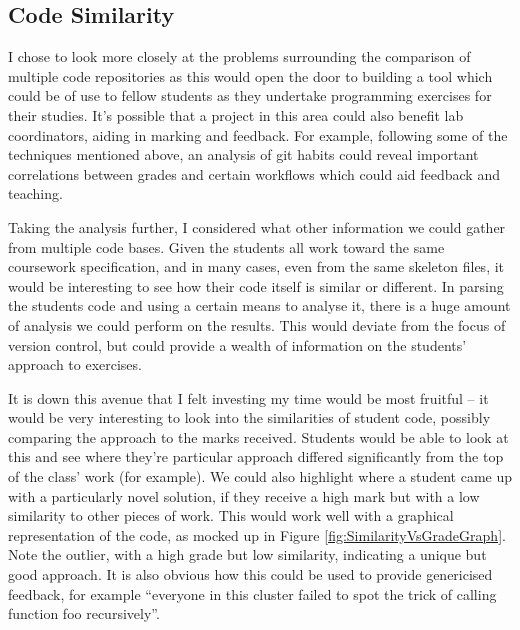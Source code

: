\subsection{Code Similarity}
\label{CodeSimBegin}

I chose to look more closely at the problems surrounding the comparison of
multiple code repositories as this would open the door to building a tool which
could be of use to fellow students as they undertake programming exercises for
their studies. It's possible that a project in this area could also benefit lab
coordinators, aiding in marking and feedback. For example, following some of the
techniques mentioned above, an analysis of git habits could reveal important
correlations between grades and certain workflows which could aid feedback and teaching.

Taking the analysis further, I considered what other information we could gather
from multiple code bases. Given the students all work toward the same coursework
specification, and in many cases, even from the same skeleton files, it would be
interesting to see how their code itself is similar or different. In parsing
the students code and using a certain means to analyse it, there is a huge 
amount of analysis we could perform on the results. This would
deviate from the focus of version control, but could provide a wealth of 
information on the students' approach to exercises.

It is down this avenue that I felt investing my time would be most fruitful --
it would be very interesting to look into the similarities of student code,
possibly comparing the approach to the marks received. Students would be
able to look at this and see where they're particular approach differed
significantly from the top of the class' work (for example). We could also
highlight where a student came up with a particularly novel solution, if they
receive a high mark but with a low similarity to other pieces of work. This
would work well with a graphical representation of the code, as mocked up in
Figure \ref{fig:SimilarityVsGradeGraph}. Note the outlier, with a high grade but
low similarity, indicating a unique but good approach. It is also obvious how
this could be used to provide genericised feedback, for example ``everyone in
this cluster failed to spot the trick of calling function foo recursively''.

